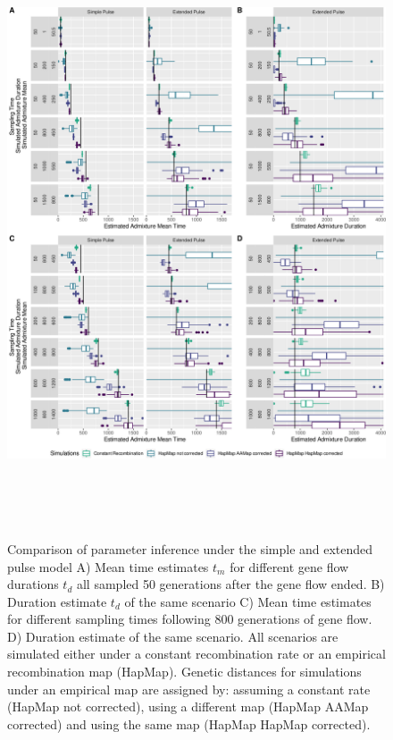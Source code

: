 \documentclass[]{article}
\begin{document}
\begin{figure}
\centering
\includegraphics[width=16cm,height=18cm,keepaspectratio]{Admixture_Time_Inference_Paper_Draft_files/figure-latex/fig4-1.pdf}
\caption{\label{fig:fig4} Comparison of parameter inference under the simple and extended pulse model  A) Mean time estimates $t_m$ for different gene
flow durations $t_d$ all sampled 50 generations after the gene flow ended. B)
Duration estimate $t_d$ of the same scenario C) Mean time estimates for different sampling times following 800
generations of gene flow. D) Duration estimate of the same scenario. All scenarios are simulated either under a constant recombination rate or an empirical recombination map (HapMap). Genetic distances for simulations under an empirical map are assigned by: assuming a constant rate (HapMap not corrected), using a different map (HapMap AAMap corrected) and using the same map (HapMap HapMap corrected).}
\end{figure}
\end{document}
